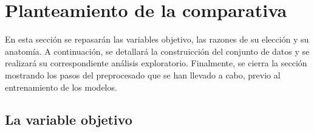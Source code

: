 \chapter{Planteamiento de la comparativa}
\label{cap:planteamiento}

En esta sección se repasarán las variables objetivo, las razones de su elección y su anatomía. A continuación, se detallará la construicción del conjunto de datos y se realizará su correspondiente análisis exploratorio. Finalmente, se cierra la sección mostrando los pasos del preprocesado que se han llevado a cabo, previo al entrenamiento de los modelos.


\section{La variable objetivo}
\label{cap:variable}

